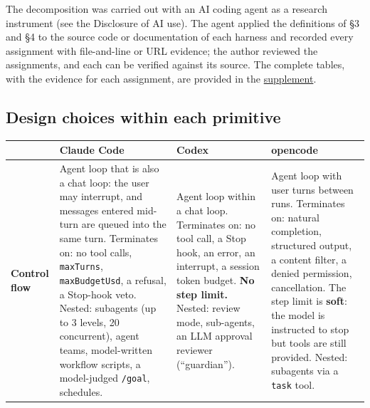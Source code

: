 The decomposition was carried out with an AI coding agent as a research instrument (see the Disclosure of AI use). The agent applied the definitions of §3 and §4 to the source code or documentation of each harness and recorded every assignment with file-and-line or URL evidence; the author reviewed the assignments, and each can be verified against its source. The complete tables, with the evidence for each assignment, are provided in the \href{https://github.com/averagejoeslab/building-agents/blob/main/paper/decomposition-study.md}{supplement}.

\subsection{Design choices within each primitive}

{\def\LTcaptype{none} 
\begin{longtable}[]{@{}
  >{\raggedright\arraybackslash}p{}
  >{\raggedright\arraybackslash}p{}
  >{\raggedright\arraybackslash}p{}
  >{\raggedright\arraybackslash}p{}@{}}
\toprule\noalign{}
\begin{minipage}[b]{\linewidth}\raggedright
\end{minipage} & \begin{minipage}[b]{\linewidth}\raggedright
Claude Code
\end{minipage} & \begin{minipage}[b]{\linewidth}\raggedright
Codex
\end{minipage} & \begin{minipage}[b]{\linewidth}\raggedright
opencode
\end{minipage} \\
\midrule\noalign{}
\endhead
\bottomrule\noalign{}
\endlastfoot
\textbf{Control flow} & Agent loop that is also a chat loop: the user may interrupt, and messages entered mid-turn are queued into the same turn. Terminates on: no tool calls, \passthrough{\lstinline!maxTurns!}, \passthrough{\lstinline!maxBudgetUsd!}, a refusal, a Stop-hook veto. Nested: subagents (up to 3 levels, 20 concurrent), agent teams, model-written workflow scripts, a model-judged \passthrough{\lstinline!/goal!}, schedules. & Agent loop within a chat loop. Terminates on: no tool call, a Stop hook, an error, an interrupt, a session token budget. \textbf{No step limit.} Nested: review mode, sub-agents, an LLM approval reviewer (``guardian''). & Agent loop with user turns between runs. Terminates on: natural completion, structured output, a content filter, a denied permission, cancellation. The step limit is \textbf{soft}: the model is instructed to stop but tools are still provided. Nested: subagents via a \passthrough{\lstinline!task!} tool. \\

\end{longtable}}
